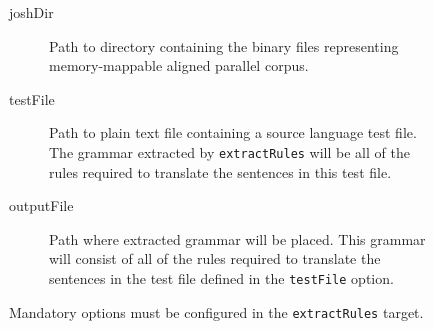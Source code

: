 \documentclass{pbml}
\begin{document}
\begin{figure}
\begin{description}

	\item[joshDir] Path to directory containing the binary files representing memory-mappable aligned parallel corpus.

	\item[testFile] Path to plain text file containing a source language test file. The grammar extracted by {\tt extractRules} will be all of the rules required to translate the sentences in this test file.

	\item[outputFile] Path where extracted grammar will be placed. This grammar will consist of all of the rules required to translate the sentences in the test file defined in the {\tt testFile} option.
\end{description}
\caption{Mandatory options must be configured in the {\tt extractRules} target.}
\end{figure}
\end{document}
